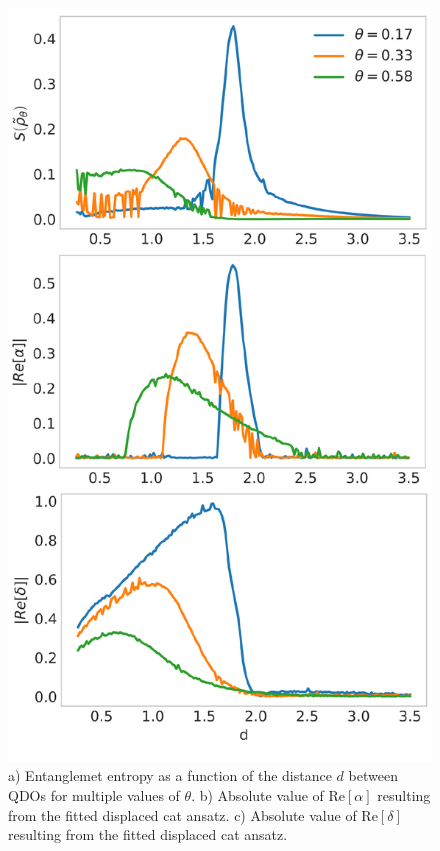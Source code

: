 \documentclass[reprint, amsmath, amssymb, floatfix, aps, pra]{revtex4-2}
\begin{document}
\begin{figure}[h]
    \hspace{-0.75cm}
    \centering
    \includegraphics[scale=0.45]{figures/tripleplot.pdf}
    \caption{\label{fig:entropy_correlation}a) Entanglemet entropy as a function of the distance $d$ between QDOs for multiple values of $\theta$. b) Absolute value of $\mathrm{Re}\left[\alpha\right]$ resulting from the fitted displaced cat ansatz. c) Absolute value of $\mathrm{Re}\left[\delta\right]$ resulting from the fitted displaced cat ansatz.} 
\end{figure}
\end{document}
